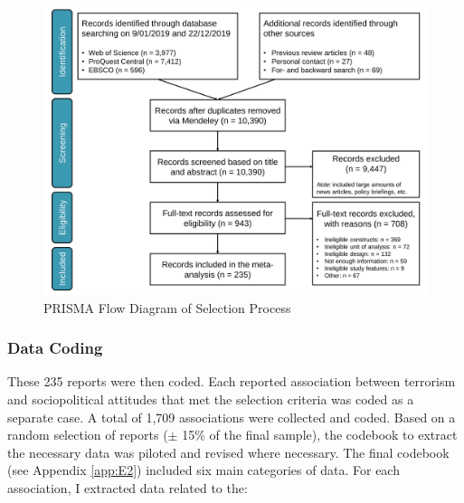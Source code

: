 \vspace{3mm}
\begin{figure}[H]
\centering
\includegraphics[width=\textwidth]{Chapter_5/art4-figure1.jpg}
\caption{PRISMA Flow Diagram of Selection Process}
\label{fig:art4-fig1}
\end{figure}
\vspace{3mm}



\subsubsection{Data Coding}
These 235 reports were then coded. Each reported association between terrorism and sociopolitical attitudes that met the selection criteria was coded as a separate case. A total of 1,709 associations were collected and coded. Based on a random selection of reports ($\pm$ 15\% of the final sample), the codebook to extract the necessary data was piloted and revised where necessary. The final codebook (see Appendix \ref{app:E2}) included six main categories of data. For each association, I extracted data related to the:

